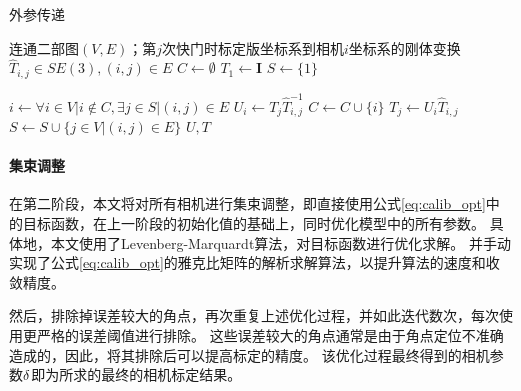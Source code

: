 \begin{algorithm}[t]
    \caption{外参传递}
    \label{alg:calib_init}
    \begin{algorithmic}[1]
        \Require 连通二部图$(V,E)$；第$j$次快门时标定版坐标系到相机$i$坐标系的刚体变换$\hat{T}_{i,j}\in SE(3),(i,j)\in E$
            \State $C \gets \emptyset$
            \State $T_{1} \gets \mathbf{I}$
            \State $S \gets \{1\}$

                \State $i \gets \forall i\in V| i\notin C, \exists j\in S| (i,j)\in E$
                \State $U_{i} \gets T_{j}\hat{T}_{i,j}^{-1}$
                \State $C \gets C \cup \{i\}$
                    \State $T_{j} \gets U_{i}\hat{T}_{i,j}$
                \EndFor
                \State $S \gets S \cup \{j\in V| (i,j)\in E\}$
            \EndWhile
            \State \Return $U, T$
        \EndProcedure
    \end{algorithmic}
\end{algorithm}

\paragraph{集束调整}在第二阶段，本文将对所有相机进行集束调整，即直接使用公式\eqref{eq:calib_opt}中的目标函数，在上一阶段的初始化值的基础上，同时优化模型中的所有参数。
具体地，本文使用了Levenberg-Marquardt算法\cite{lm}，对目标函数进行优化求解。
并手动实现了公式\eqref{eq:calib_opt}的雅克比矩阵的解析求解算法，以提升算法的速度和收敛精度。

然后，排除掉误差较大的角点，再次重复上述优化过程，并如此迭代数次，每次使用更严格的误差阈值进行排除。
这些误差较大的角点通常是由于角点定位不准确造成的，因此，将其排除后可以提高标定的精度。
该优化过程最终得到的相机参数$\delta$即为所求的最终的相机标定结果。
